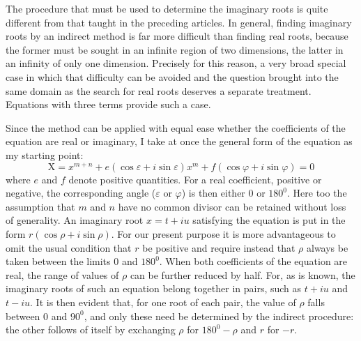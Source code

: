 The procedure that must be used to determine the imaginary roots is quite different from that taught in the preceding articles. In general, finding imaginary roots by an indirect method is far more difficult than finding real roots, because the former must be sought in an infinite region of two dimensions, the latter in an infinity of only one dimension. Precisely for this reason, a very broad special case in which that difficulty can be avoided and the question brought into the same domain as the search for real roots deserves a separate treatment. Equations with three terms provide such a case.

Since the method can be applied with equal ease whether the coefficients of the equation are real or imaginary, I take at once the general form of the equation as my starting point:
\[
\mathrm{X}=x^{m+n}+e(\cos\varepsilon+i\sin\varepsilon)x^m+f(\cos\varphi+i\sin\varphi)=0
\]
where $e$ and $f$ denote positive quantities. For a real coefficient, positive or negative, the corresponding angle ($\varepsilon$ or $\varphi$) is then either $0$ or $180^{0}$. Here too the assumption that $m$ and $n$ have no common divisor can be retained without loss of generality. An imaginary root $x=t+iu$ satisfying the equation is put in the form $r(\cos\rho+i\sin\rho)$. For our present purpose
it is more advantageous to omit the usual condition that $r$ be positive and require instead that $\rho$ always be taken between the limits $0$ and $180^{0}$. When both coefficients of the equation are real, the range of values of $\rho$ can be further reduced by half. For, as is known, the imaginary roots of such an equation belong together in pairs, such as $t+iu$ and $t-iu$. It is then evident that, for one root of each pair, the value of $\rho$ falls between $0$ and $90^{0}$, and only these need be determined by the indirect procedure: the other follows of itself by exchanging $\rho$ for $180^{0}-\rho$ and $r$ for $-r$.


